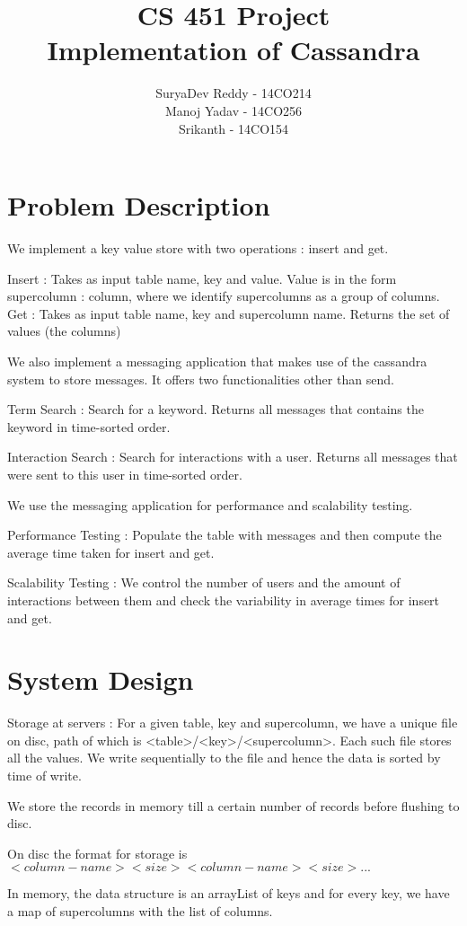 \documentclass {article}
\title {CS 451 Project \\Implementation of Cassandra}
\author {SuryaDev Reddy - 14CO214\\ Manoj Yadav - 14CO256 \\ Srikanth - 14CO154}
\begin{document}
\maketitle

\section {Problem Description}
We implement a key value store with two operations : insert and get.

Insert : Takes as input table name, key and value. Value is in the form supercolumn : column, where we identify supercolumns as a group of columns.
Get : Takes as input table name, key and supercolumn name. Returns the set of values (the columns)

We also implement a messaging application that makes use of the cassandra system to store messages. It offers two functionalities other than send.

Term Search : Search for a keyword. Returns all messages that contains the keyword in time-sorted order.

Interaction Search : Search for interactions with a user. Returns all messages that were sent to this user in time-sorted order.

We use the messaging application for performance and scalability testing.

Performance Testing : Populate the table with messages and then compute the average time taken for insert and get.

Scalability Testing : We control the number of users and the amount of interactions between them and check the variability in average times for insert and get.

\section {System Design}
Storage at servers : For a given table, key and supercolumn, we have a unique file on disc, path of which is <table>/<key>/<supercolumn>. Each such file stores all the values. We write sequentially to the file and hence the data is sorted by time of write.

We store the records in memory till a certain number of records before flushing to disc.

On disc the format for storage is $<column-name> <size> <column-name> <size> ...$

In memory, the data structure is an arrayList of keys and for every key, we have a map of supercolumns with the list of columns.
\end{document}
